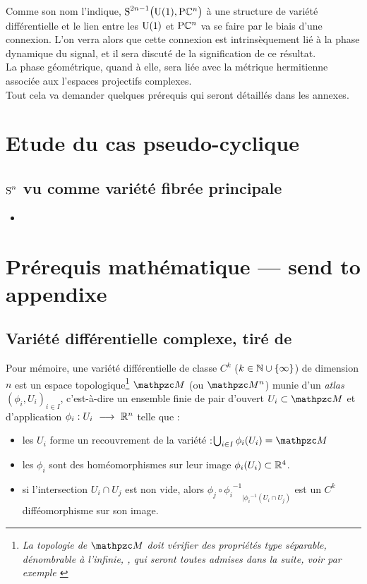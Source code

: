 Comme son nom l'indique, $\S{2n-1}\big(\U{1},\PC{n}\big)$ à une structure de variété différentielle et le lien entre les $\U{1}$ et $\PC{n}$ va se faire par le biais d'une connexion. L'on verra alors que cette connexion est intrinsèquement lié à la phase dynamique du signal, et il sera discuté de la signification de ce résultat.
\\
La phase géométrique, quand à elle, sera liée avec la métrique hermitienne associée aux l'espaces projectifs complexes.
\\
Tout cela va demander quelques prérequis qui seront détaillés dans les annexes. 



\section{Etude du cas pseudo-cyclique}

\subsection{$\S{n}$ vu comme variété fibrée principale}

\begin{itemize}
	\item 
\end{itemize}


\section{Prérequis mathématique --- send to appendixe}

\subsection{Variété différentielle complexe, tiré de \cite{nakahara_geometry_2003}}



Pour mémoire, une variété différentielle de classe $C^k$ ($k\in\N\cup\{\infty\}$) de dimension $n$ est un espace topologique\footnote{\itshape
	La topologie de $\manu$ doit vérifier des propriétés type séparable, dénombrable à l'infinie, \etc, qui seront toutes admises dans la suite, voir par exemple \cite[chap. 2]{lafontaine_introduction_2015}}
$\manu$ (ou $\manu^n$) munie d'un \emph{atlas} $(\phi_i, U_i)_{i\in I}$, c'est-à-dire un ensemble finie de pair d'ouvert $U_i\subset \manu$ et d'application $\phi_i :U_i\ \lr\ \R^n$ telle que :
\begin{itemize}
	
	\item les $U_i$ forme un recouvrement de la variété :\qquad $\bigcup_{i\in I} \phi_i(U_i) = \manu$
	
	\item les $\phi_i$ sont des homéomorphismes sur leur image $\phi_i(U_i)\subset\R^4$.
	
	\item si l'intersection $U_i \cap U_j$ est non vide, alors ${\phi_j \circ {\phi_i}^{-1}}_{| {\phi_i}^{-1}(U_i\cap U_j)}$ est un $C^k$ difféomorphisme sur son image.
\end{itemize}

